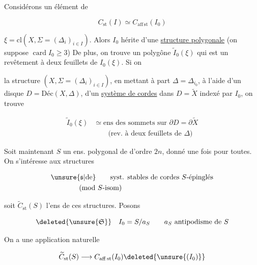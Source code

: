 
Considérons un élément de

\[
 C_{\mathrm{st}}(I)\simeq C_{\mathrm{aff\,st}}(I_0)
\]

$\xi=\mathrm{cl}(X,\Sigma=(\Delta_i)_{i\in I})$. Alors $I_0$ hérite d'une \uline{structure polygonale}  (on suppose $\operatorname{card} I_0\geq 3$) De plus, on trouve un polygône $\widetilde I_0(\xi)$ qui est un revêtement à deux feuillets de $I_0(\xi)$. Si on


  la structure $(X,\Sigma=(\Delta_i)_{i\in I})$, en mettant à part $\Delta=\Delta_{i_0}$, à l'aide d'un disque $D=\mathrm{Déc}(X,\Delta)$,   d'un \uline{système  de cordes} \inserted{$\widetilde\Sigma$} dans $D=\widetilde X$ indexé par $I_0$, on trouve 

\[
\begin{aligned}
\widetilde I_0(\xi)&\simeq\text{ens des sommets sur }\partial D=\partial\widetilde X\\
&\qquad\text{(rev. à deux feuillets de }\Delta\text{)}
\end{aligned}
\]

Soit maintenant $S$ un ens. polygonal de  d'ordre $2n$, donné une fois pour toutes. On s'intéresse aux structures

\[
\begin{aligned}
&\unsure{\mathfrak s|\text{de}}\qquad\text{syst. stables de cordes }S\text{-épinglés}\\
&\hspace{4em}\text{(mod }S\text{-isom)}
\end{aligned}
\]

soit $\widetilde C_{\mathrm{st}}(S)$ l'ens de ces structures. Posons

\[
\deleted{\unsure{\mathfrak S}}\quad I_0=S/a_S\qquad a_S\ \text{antipodisme de }S
\]

On a une application naturelle

\[
\widetilde C_{\mathrm{st}}(S)\longrightarrow C_{\mathrm{aff\,st}}(I_0)\deleted{\unsure{(I_0)}}
\]

